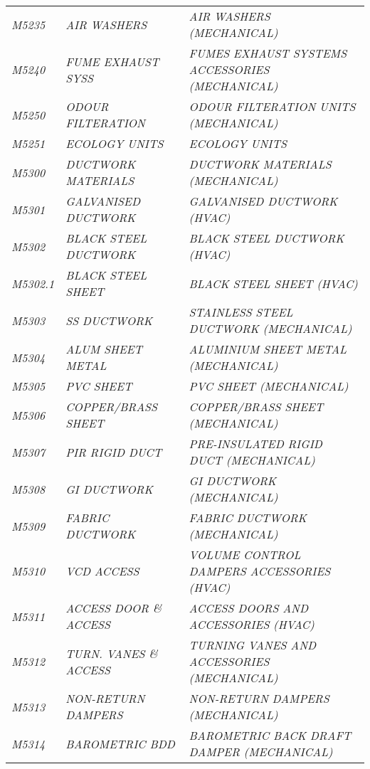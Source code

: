 \begin{landscape}
\begin{longtable}[l]{l%
                  l|%
                  l|}
\itshape M5235       &\itshape AIR WASHERS   &\itshape AIR WASHERS (MECHANICAL)   \\
\itshape M5240       &\itshape FUME EXHAUST SYSS   &\itshape FUMES EXHAUST SYSTEMS ACCESSORIES (MECHANICAL)   \\
\itshape M5250       &\itshape ODOUR FILTERATION   &\itshape ODOUR FILTERATION UNITS (MECHANICAL)   \\
\itshape M5251       &\itshape ECOLOGY UNITS   &\itshape ECOLOGY UNITS   \\
\itshape M5300       &\itshape DUCTWORK MATERIALS   &\itshape DUCTWORK MATERIALS (MECHANICAL)   \\
\itshape M5301       &\itshape GALVANISED DUCTWORK   &\itshape GALVANISED DUCTWORK (HVAC)   \\
\itshape M5302       &\itshape BLACK STEEL DUCTWORK   &\itshape BLACK STEEL DUCTWORK (HVAC)   \\
\itshape M5302.1     &\itshape BLACK STEEL SHEET   &\itshape BLACK STEEL SHEET (HVAC)   \\
\itshape M5303       &\itshape SS DUCTWORK   &\itshape STAINLESS STEEL DUCTWORK (MECHANICAL)   \\
\itshape M5304       &\itshape ALUM SHEET METAL   &\itshape ALUMINIUM SHEET METAL (MECHANICAL)   \\
\itshape M5305       &\itshape PVC SHEET   &\itshape PVC SHEET (MECHANICAL)   \\
\itshape M5306       &\itshape COPPER/BRASS SHEET   &\itshape COPPER/BRASS SHEET (MECHANICAL)   \\
\itshape M5307       &\itshape PIR RIGID DUCT   &\itshape PRE-INSULATED RIGID DUCT (MECHANICAL)   \\
\itshape M5308       &\itshape GI DUCTWORK   &\itshape GI DUCTWORK (MECHANICAL)   \\
\itshape M5309       &\itshape FABRIC DUCTWORK   &\itshape FABRIC DUCTWORK (MECHANICAL)   \\
\itshape M5310       &\itshape VCD ACCESS   &\itshape VOLUME CONTROL DAMPERS ACCESSORIES (HVAC)   \\
\itshape M5311       &\itshape ACCESS DOOR \& ACCESS   &\itshape ACCESS DOORS AND ACCESSORIES (HVAC)   \\
\itshape M5312       &\itshape TURN. VANES \& ACCESS   &\itshape TURNING VANES AND ACCESSORIES (MECHANICAL)   \\
\itshape M5313       &\itshape NON-RETURN DAMPERS   &\itshape NON-RETURN DAMPERS (MECHANICAL)   \\
\itshape M5314       &\itshape BAROMETRIC BDD   &\itshape BAROMETRIC BACK DRAFT DAMPER (MECHANICAL)   \\

\end{longtable}
\end{landscape}
